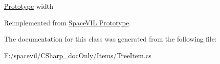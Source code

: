 \mbox{\hyperlink{class_space_v_i_l_1_1_prototype}{Prototype}} width 



Reimplemented from \mbox{\hyperlink{class_space_v_i_l_1_1_prototype_a6a4f1b9581f4d18f1c3a3e287d4b2a2b}{Space\+V\+I\+L.\+Prototype}}.



The documentation for this class was generated from the following file\+:\begin{DoxyCompactItemize}
\item 
F\+:/spacevil/\+C\+Sharp\+\_\+doc\+Only/\+Items/Tree\+Item.\+cs\end{DoxyCompactItemize}
